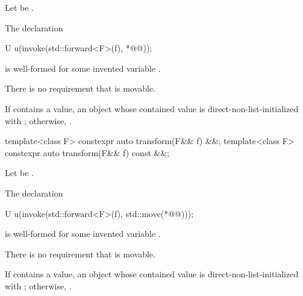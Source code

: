 \begin{itemdescr}
\pnum
Let  be .

\pnum
\mandates
{}
The declaration
\begin{codeblock}
U u(invoke(std::forward<F>(f), *@@));
\end{codeblock}
is well-formed for some invented variable .
\begin{note}
There is no requirement that  is movable.
\end{note}

\pnum
\returns
If  contains a value, an  object
whose contained value is direct-non-list-initialized with
;
otherwise, .
\end{itemdescr}

\begin{itemdecl}
template<class F> constexpr auto transform(F&& f) &&;
template<class F> constexpr auto transform(F&& f) const &&;
\end{itemdecl}

\begin{itemdescr}
\pnum
Let  be
.

\pnum
\mandates
{}
The declaration
\begin{codeblock}
U u(invoke(std::forward<F>(f), std::move(*@@)));
\end{codeblock}
is well-formed for some invented variable .
\begin{note}
There is no requirement that  is movable.
\end{note}

\pnum
\returns
If  contains a value, an  object
whose contained value is direct-non-list-initialized with
;
otherwise, .
\end{itemdescr}

